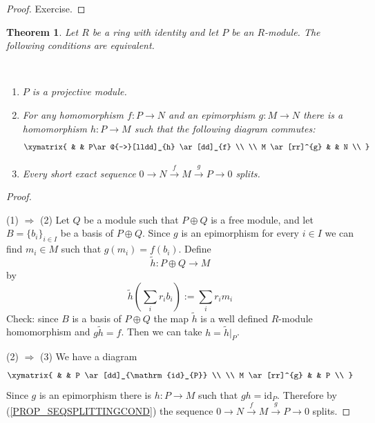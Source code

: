 \documentclass[12pt, letterpaper, oneside]{article}
\theoremstyle{plain}
\newtheorem{theorem}{Theorem}[section]
\theoremstyle{definition}
\newcommand{\lra}{\longrightarrow}
\newcommand{\id}{\mathrm{id}}
\newcommand{\benu}{\begin{enumerate}}
\newcommand{\eenu}{\end{enumerate}}
\newcommand{\vs}{\vskip 5mm}
\newcommand{\isep}[1][0]{\setlength{\itemsep}{#1 mm}}
\begin{document}
\vs

\begin{proof}
Exercise. 
\end{proof}





\vs\vs

\begin{theorem}
\label{THM_PROJMODEQUIVCOND}
Let $R$ be a ring with identity and let $P$ be an $R$-module. The following conditions are equivalent.

\vskip -13mm

\ 
\benu
\isep[5]
\item $P$ is a projective module.
\item For any homomorphism $f\colon P\to N$ and an epimorphism $g\colon M\to N$
there is a homomorphism $h\colon P\to M$ such that the following diagram commutes:
 $$
\xymatrix{
& & P\ar@{-->}[lldd]_{h} \ar[dd]_{f} \\
\\
M \ar[rr]^{g}  & & N \\
}
$$ 
\item Every short exact sequence  $0 \to N \overset{f}{\lra} M \overset{g}{\lra} P \to 0$
splits. 
\eenu

\end{theorem}

\vs


\begin{proof}\ 

(1) $\Rightarrow$ (2) Let $Q$ be a module such that $P\oplus Q$ is a free module, and 
let  $B= \{b_{i}\}_{i\in I}$ be a basis of $P\oplus Q$. Since $g$ is an epimorphism for every $i\in I$
we can find $m_{i}\in M$ such that $g(m_{i})=f(b_{i})$. Define 
$$\tilde h\colon P\oplus Q \lra M$$ 
by  
$$\tilde h\left(\sum_{i} r_{i}b_{i}\right)  := \sum_{i} r_{i}m_{i}$$
Check: since $B$ is a basis of $P\oplus Q$ the map $\tilde h$ is a well defined  $R$-module 
homomorphism and $g\tilde h=f$. Then we can take $h = \tilde h|_{P}$.  


\vs

(2) $\Rightarrow$ (3) We have a diagram 
 $$
\xymatrix{
& & P \ar[dd]_{\id_{P}} \\
\\
M \ar[rr]^{g}  & & P \\
}
$$ 
Since $g$ is an epimorphism there is $h\colon P\to M$ such that $gh = \id_{P}$. Therefore 
by (\ref{PROP_SEQSPLITTINGCOND}) the sequence $0 \to N \overset{f}{\lra} M \overset{g}{\lra} P \to 0$
splits.
\end{proof}
\end{document}
